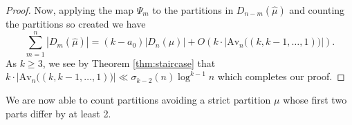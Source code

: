 \documentclass{article}
\theoremstyle{plain}
\theoremstyle{definition}
\newcommand{\Av}{\text{Av}}
\begin{document}
\begin{proof}
\medskip


Now, applying the map $\Psi_m$ to the partitions in $D_{n-m}(\hat \mu)$ and counting the partitions so created we have
$$\sum_{m=1}^{n} |D_m(\hat\mu)| = (k-a_0)|D_n(\mu)|+ O\left(k\cdot \left|\Av_n\big((k,k-1,\ldots, 1)\big) \right|\right).$$
As $k\geq 3$, we see by Theorem \ref{thm:staircase} that $k\cdot \left|\Av_n \big((k,k-1,\ldots, 1)\big) \right| \ll \sigma_{k-2}(n)\log^{k-1} n$
 which completes our proof. 
\end{proof}











\noindent We are now able to count  partitions avoiding a strict partition $\mu$ whose first two parts differ by at least 2.  
\end{document}
